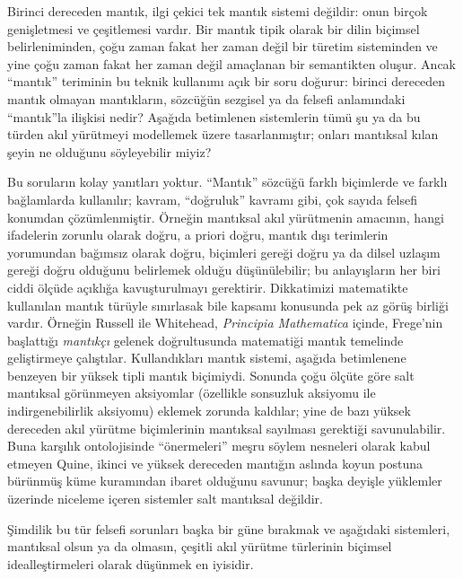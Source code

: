



Birinci dereceden mantık, ilgi çekici tek mantık sistemi değildir: onun birçok
genişletmesi ve çeşitlemesi vardır. Bir mantık tipik olarak bir dilin biçimsel
belirleniminden, çoğu zaman fakat her zaman değil bir türetim sisteminden ve
yine çoğu zaman fakat her zaman değil amaçlanan bir semantikten oluşur. Ancak
``mantık'' teriminin bu teknik kullanımı açık bir soru doğurur: birinci
dereceden mantık olmayan mantıkların, sözcüğün sezgisel ya da felsefi
anlamındaki ``mantık''la ilişkisi nedir? Aşağıda betimlenen sistemlerin tümü
şu ya da bu türden akıl yürütmeyi modellemek üzere tasarlanmıştır; onları
mantıksal kılan şeyin ne olduğunu söyleyebilir miyiz?

Bu soruların kolay yanıtları yoktur. ``Mantık'' sözcüğü farklı biçimlerde ve
farklı bağlamlarda kullanılır; kavram, ``doğruluk'' kavramı gibi, çok sayıda
felsefi konumdan çözümlenmiştir. Örneğin mantıksal akıl yürütmenin amacının,
hangi ifadelerin zorunlu olarak doğru, a priori doğru, mantık dışı terimlerin
yorumundan bağımsız olarak doğru, biçimleri gereği doğru ya da dilsel uzlaşım
gereği doğru olduğunu belirlemek olduğu düşünülebilir; bu anlayışların her
biri ciddi ölçüde açıklığa kavuşturulmayı gerektirir. Dikkatimizi matematikte
kullanılan mantık türüyle sınırlasak bile kapsamı konusunda pek az görüş
birliği vardır. Örneğin Russell ile Whitehead, \textit{Principia Mathematica}
içinde, Frege'nin başlattığı {\em mantıkçı} gelenek doğrultusunda matematiği
mantık temelinde geliştirmeye çalıştılar. Kullandıkları mantık sistemi,
aşağıda betimlenene benzeyen bir yüksek tipli mantık biçimiydi. Sonunda çoğu
ölçüte göre salt mantıksal görünmeyen aksiyomlar (özellikle sonsuzluk aksiyomu
ile indirgenebilirlik aksiyomu) eklemek zorunda kaldılar; yine de bazı yüksek
dereceden akıl yürütme biçimlerinin mantıksal sayılması gerektiği savunulabilir.
Buna karşılık ontolojisinde ``önermeleri'' meşru söylem nesneleri olarak kabul
etmeyen Quine, ikinci ve yüksek dereceden mantığın aslında koyun postuna
bürünmüş küme kuramından ibaret olduğunu savunur; başka deyişle yüklemler
üzerinde niceleme içeren sistemler salt mantıksal değildir.

Şimdilik bu tür felsefi sorunları başka bir güne bırakmak ve aşağıdaki
sistemleri, mantıksal olsun ya da olmasın, çeşitli akıl yürütme türlerinin
biçimsel idealleştirmeleri olarak düşünmek en iyisidir.

